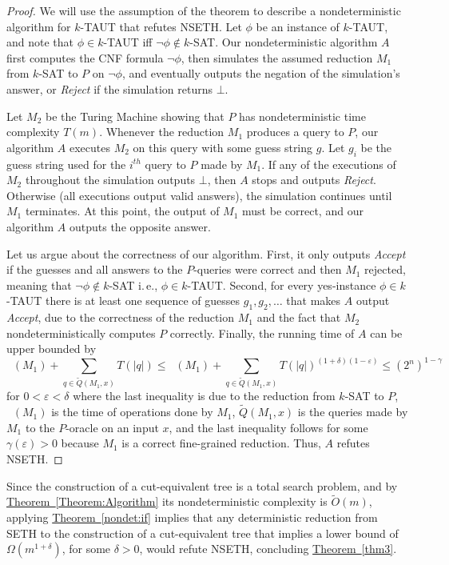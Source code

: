 \documentclass[11pt]{article}
\numberwithin{equation}{section}
\theoremstyle{definition}
\theoremstyle{plain}
\newcommand{\ie}{i.\,e.}
\newcommand{\expref}[2]{\hyperref[#2]{#1~\ref{#2}}}
\theoremstyle{plain}
\newcommand{\SETH}{SETH\xspace}
\newcommand{\NSETH}{NSETH\xspace}
\DeclareMathOperator{\THALT}{\mathsf{T_{HALT}}}
\newcommand\eps{\varepsilon}
\newcommand\tO{\ensuremath{\widetilde O}}  %
\providecommand{\card}[1]{\lvert#1\rvert}
\begin{document}
\begin{proof}
We will use the assumption of the theorem to describe a nondeterministic algorithm for $k$-TAUT that refutes \NSETH.
Let $\phi$ be an instance of $k$-TAUT, and note that $\phi \in k$-TAUT iff $\neg \phi \notin k$-SAT.
Our nondeterministic algorithm $A$ first computes the CNF formula $\neg \phi$, then simulates the assumed reduction $M_1$ from $k$-SAT to $P$ on $\neg \phi$, and eventually outputs the negation of the simulation's answer, or \textsl{Reject} if the simulation returns $\bot$.

Let $M_2$ be the Turing Machine showing that $P$ has nondeterministic time complexity $T(m)$.
Whenever the reduction $M_1$ produces a query to $P$, our algorithm $A$ executes $M_2$ on this query with some guess string $g$. Let $g_i$ be the guess string used for the $i^{th}$ query to $P$ made by $M_1$. If any of the executions of $M_2$ throughout the simulation outputs $\bot$, then $A$ stops and outputs \textsl{Reject}. Otherwise (all executions output valid answers), the simulation continues until $M_1$ terminates. At this point, the output of $M_1$ must be correct, and our algorithm $A$ outputs the opposite answer.

Let us argue about the correctness of our algorithm. First, it only outputs \textsl{Accept} if the guesses and all answers to the $P$-queries were correct and then $M_1$ rejected, meaning that $\neg \phi \notin k$-SAT \ie, $\phi \in k$-TAUT.
Second, for every yes-instance $\phi \in k$-TAUT there is at least one sequence of guesses $g_1,g_2,\ldots$ that makes $A$ output \textsl{Accept}, due to the correctness of the reduction $M_1$ and the fact that $M_2$ nondeterministically computes $P$ correctly.
Finally, the running time of $A$ can be upper bounded by
%
$$
\THALT(M_1) + \sum_{q\in \widetilde{Q}(M_1,x)}T(\card{q}) \leq \THALT(M_1)
+\sum_{q\in \widetilde{Q}(M_1,x)}T(\card{q})^{(1+\delta)(1-\eps)}\leq (2^n)^{1-\gamma}
$$
for $0<\varepsilon<\delta$ where the last inequality is due to the reduction from $k$-SAT to $P$, $\THALT(M_1)$ is the time of operations done by $M_1$,
%
$\widetilde{Q}(M_1,x)$
is the queries made by $M_1$ to the $P$-oracle on an input $x$, and the last inequality follows for some $\gamma(\varepsilon)>0$ because $M_1$ is a correct fine-grained reduction.
Thus, $A$ refutes \NSETH.
\end{proof}

Since the construction of a cut-equivalent tree is a total search problem, and by \expref{Theorem}{Theorem:Algorithm} its nondeterministic complexity is $\tO(m)$, applying \expref{Theorem}{nondet:if} implies that any deterministic reduction from \SETH to the construction of a cut-equivalent tree that implies a lower bound of $\Omega(m^{1+\delta})$, for some $\delta>0$, would refute \NSETH, concluding \expref{Theorem}{thm3}.
\end{document}
